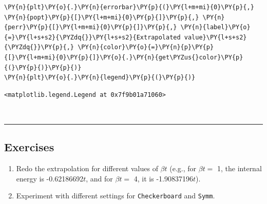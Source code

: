 \begin{tcolorbox}[breakable, size=fbox, boxrule=1pt, pad at break*=1mm,colback=cellbackground, colframe=cellborder]
\begin{Verbatim}[commandchars=\\\{\}]
\PY{n}{plt}\PY{o}{.}\PY{n}{errorbar}\PY{p}{(}\PY{l+m+mi}{0}\PY{p}{,} \PY{n}{popt}\PY{p}{[}\PY{l+m+mi}{0}\PY{p}{]}\PY{p}{,} \PY{n}{perr}\PY{p}{[}\PY{l+m+mi}{0}\PY{p}{]}\PY{p}{,} \PY{n}{label}\PY{o}{=}\PY{l+s+s2}{\PYZdq{}}\PY{l+s+s2}{Extrapolated value}\PY{l+s+s2}{\PYZdq{}}\PY{p}{,} \PY{n}{color}\PY{o}{=}\PY{n}{p}\PY{p}{[}\PY{l+m+mi}{0}\PY{p}{]}\PY{o}{.}\PY{n}{get\PYZus{}color}\PY{p}{(}\PY{p}{)}\PY{p}{)}
\PY{n}{plt}\PY{o}{.}\PY{n}{legend}\PY{p}{(}\PY{p}{)}
\end{Verbatim}
\end{tcolorbox}

            \begin{tcolorbox}[breakable, size=fbox, boxrule=.5pt, pad at break*=1mm, opacityfill=0]
\begin{Verbatim}[commandchars=\\\{\}]
<matplotlib.legend.Legend at 0x7f9b01a71060>
\end{Verbatim}
\end{tcolorbox}
        
    \begin{center}
    \end{center}
    { \hspace*{\fill} \\}
    
    \begin{center}\rule{0.5\linewidth}{0.5pt}\end{center}

\hypertarget{exercises}{%
\subsection{Exercises}\label{exercises}}

\begin{enumerate}
\def\labelenumi{\arabic{enumi}.}
\tightlist
\item
  Redo the extrapolation for different values of \(\beta t\) (e.g., for
  \(\beta t =\) 1, the internal energy is -0.62186692\(t\), and for
  \(\beta t =\) 4, it is -1.90837196\(t\)).
\item
  Experiment with different settings for \texttt{Checkerboard} and
  \texttt{Symm}.
\end{enumerate}


    
    
    
